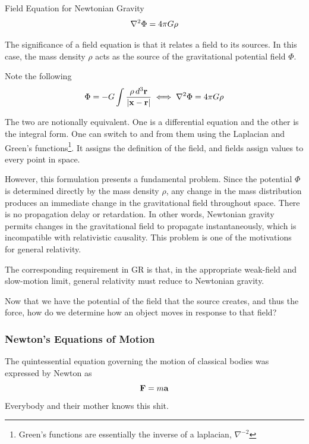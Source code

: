 		\begin{theorem}{Field Equation for Newtonian Gravity}
			\begin{equation}
			   \lpc \Phi = 4\pi G \rho  
			\end{equation}
		\end{theorem}
		The significance of a field equation is that it relates a field to its sources. In this case, the mass density $\rho$ acts as the source of the gravitational potential field $\Phi$. 
		
		Note the following
		\begin{equation}
			\Phi = -G\int \frac{\rho \dd[3]{\vb r}}{\abs{\vb{x}-\vb{r}}} 
			\iff \lpc\Phi = 4\pi G \rho 
		\end{equation}

		The two are notionally equivalent. One is a differential equation and the other is the integral form. One can switch
		to and from them using the Laplacian and Green's functions\footnote{Green's functions are essentially the inverse of a laplacian, $\nabla^{-2}$}.
		It assigns the definition of the field, and fields assign values to every point in space.

		However, this formulation presents a fundamental problem. Since the potential $\Phi$ is determined directly by the mass density $\rho$, any change in the mass distribution produces 
		an immediate change in the gravitational field throughout space. There is no propagation delay or retardation. In other words, Newtonian gravity permits changes in the gravitational
		field to propagate instantaneously, which is incompatible with relativistic causality. This problem is one of the motivations for general relativity. 

		The corresponding requirement in GR is that, in the appropriate weak-field and slow-motion limit, general relativity must reduce to Newtonian gravity.

		Now that we have the potential of the field that the source creates, and thus the force, how do we determine how an object moves in response to that field?
	\subsubsection{Newton's Equations of Motion}
		The quintessential equation governing the motion of classical bodies was expressed by Newton as
		\begin{equation}
			\vb{F} = m\vb{a}
		\end{equation}
		Everybody and their mother knows this shit.

